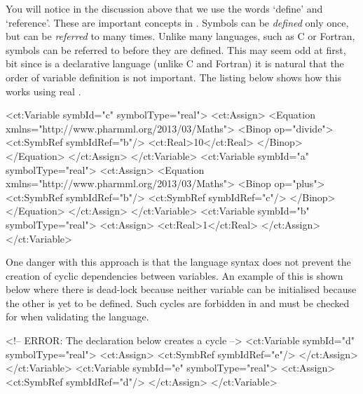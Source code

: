 You will notice in the discussion above that we use the words `define'
and `reference'. These are important concepts in \pharmml. Symbols can be
\emph{defined} only once, but can be \emph{referred} to many
times. Unlike many languages, such as C or Fortran, symbols can be
referred to before they are defined. This may seem odd at first, bit since
\pharmml is a declarative language (unlike C and Fortran) it is natural
that the order of variable definition is not important. The listing below
shows how this works using real \pharmml.
\begin{xmlcode}
<ct:Variable symbId="c" symbolType="real">
    <ct:Assign>
        <Equation xmlns="http://www.pharmml.org/2013/03/Maths">
            <Binop op="divide">
                <ct:SymbRef symbIdRef="b"/>
                <ct:Real>10</ct:Real>
            </Binop>
        </Equation>
    </ct:Assign>
</ct:Variable>
<ct:Variable symbId="a" symbolType="real">
    <ct:Assign>
        <Equation xmlns="http://www.pharmml.org/2013/03/Maths">
            <Binop op="plus">
                <ct:SymbRef symbIdRef="b"/>
                <ct:SymbRef symbIdRef="c"/>
            </Binop>
        </Equation>
    </ct:Assign>
</ct:Variable>
<ct:Variable symbId="b" symbolType="real">
    <ct:Assign>
        <ct:Real>1</ct:Real>
    </ct:Assign>
</ct:Variable>
\end{xmlcode}
%
%
One danger with this approach is that the language syntax does not
prevent the creation of cyclic dependencies between variables. An
example of this is shown below
where there is dead-lock because neither variable can be initialised
because the other is yet to be defined. Such cycles are forbidden in
\pharmml and must be checked for when validating the language.
%
\begin{xmlcode}
<!-- ERROR: The declaration below creates a cycle -->
<ct:Variable symbId="d" symbolType="real">
    <ct:Assign>
        <ct:SymbRef symbIdRef="e"/>
    </ct:Assign>
</ct:Variable>
<ct:Variable symbId="e" symbolType="real">
    <ct:Assign>
        <ct:SymbRef symbIdRef="d"/>
    </ct:Assign>
</ct:Variable>
\end{xmlcode}
